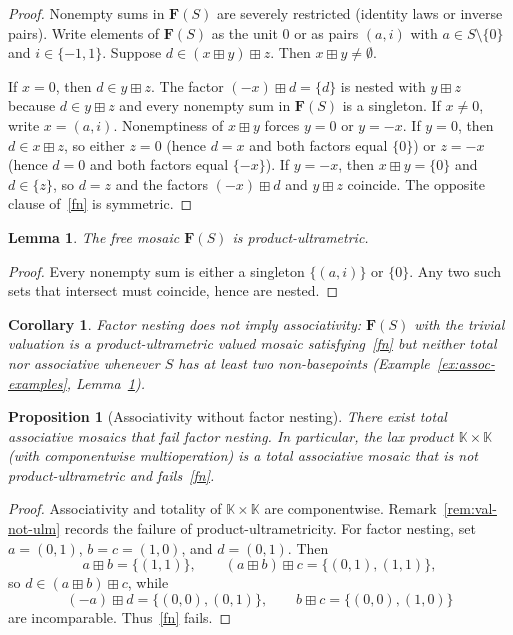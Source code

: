 \documentclass[11pt]{amsart}
\theoremstyle{plain}
\newtheorem{proposition}[theorem]{Proposition}
\newtheorem{lemma}[theorem]{Lemma}
\newtheorem{corollary}[theorem]{Corollary}
\theoremstyle{definition}
\theoremstyle{remark}
\begin{document}
\begin{proof}
Nonempty sums in \(\mathbf{F}(S)\) are severely restricted (identity laws or inverse pairs). Write elements of \(\mathbf{F}(S)\) as the unit \(0\) or as pairs \((a,i)\) with \(a\in S\setminus\{0\}\) and \(i\in\{-1,1\}\). Suppose \(d\in(x\boxplus y)\boxplus z\). Then \(x\boxplus y\neq\emptyset\).

If \(x=0\), then \(d\in y\boxplus z\). The factor \((-x)\boxplus d=\{d\}\) is nested with \(y\boxplus z\) because \(d\in y\boxplus z\) and every nonempty sum in \(\mathbf{F}(S)\) is a singleton. If \(x\neq0\), write \(x=(a,i)\). Nonemptiness of \(x\boxplus y\) forces \(y=0\) or \(y=-x\). If \(y=0\), then \(d\in x\boxplus z\), so either \(z=0\) (hence \(d=x\) and both factors equal \(\{0\}\)) or \(z=-x\) (hence \(d=0\) and both factors equal \(\{-x\}\)). If \(y=-x\), then \(x\boxplus y=\{0\}\) and \(d\in\{z\}\), so \(d=z\) and the factors \((-x)\boxplus d\) and \(y\boxplus z\) coincide. The opposite clause of~\eqref{fn} is symmetric.
\end{proof}

\begin{lemma}
\label{lem:free-ulm}
The free mosaic \(\mathbf{F}(S)\) is product-ultrametric.
\end{lemma}

\begin{proof}
Every nonempty sum is either a singleton \(\{(a,i)\}\) or \(\{0\}\). Any two such sets that intersect must coincide, hence are nested.
\end{proof}

\begin{corollary}
\label{cor:fn-not-asc}
Factor nesting does not imply associativity: \(\mathbf{F}(S)\) with the trivial valuation is a product-ultrametric valued mosaic satisfying~\eqref{fn} but neither total nor associative whenever \(S\) has at least two non-basepoints (Example~\ref{ex:assoc-examples}, Lemma~\ref{lem:free-ulm}).
\end{corollary}

\begin{proposition}[Associativity without factor nesting]
\label{prop:asc-not-fn}
There exist total associative mosaics that fail factor nesting. In particular, the lax product \(\mathbb{K}\times\mathbb{K}\) (with componentwise multioperation) is a total associative mosaic that is not product-ultrametric and fails~\eqref{fn}.
\end{proposition}

\begin{proof}
Associativity and totality of \(\mathbb{K}\times\mathbb{K}\) are componentwise. Remark~\ref{rem:val-not-ulm} records the failure of product-ultrametricity. For factor nesting, set \(a=(0,1)\), \(b=c=(1,0)\), and \(d=(0,1)\). Then
\[
a\boxplus b=\{(1,1)\},\qquad
(a\boxplus b)\boxplus c=\{(0,1),(1,1)\},
\]
so \(d\in(a\boxplus b)\boxplus c\), while
\[
(-a)\boxplus d=\{(0,0),(0,1)\},\qquad
b\boxplus c=\{(0,0),(1,0)\}
\]
are incomparable. Thus~\eqref{fn} fails.
\end{proof}
\end{document}
